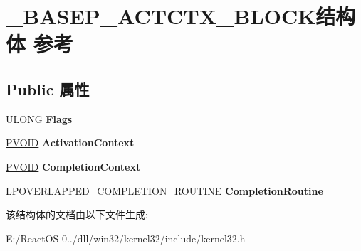 \hypertarget{struct___b_a_s_e_p___a_c_t_c_t_x___b_l_o_c_k}{}\section{\+\_\+\+B\+A\+S\+E\+P\+\_\+\+A\+C\+T\+C\+T\+X\+\_\+\+B\+L\+O\+C\+K结构体 参考}
\label{struct___b_a_s_e_p___a_c_t_c_t_x___b_l_o_c_k}
\subsection*{Public 属性}
\begin{DoxyCompactItemize}
\item 
\mbox{\label{struct___b_a_s_e_p___a_c_t_c_t_x___b_l_o_c_k_a3baee8956885171d416ee0adf0d7a9a3}} 
U\+L\+O\+NG {\bfseries Flags}
\item 
\mbox{\label{struct___b_a_s_e_p___a_c_t_c_t_x___b_l_o_c_k_a634e7fb89d1d0fbf27ab8cabf8c790a0}} 
\hyperlink{interfacevoid}{P\+V\+O\+ID} {\bfseries Activation\+Context}
\item 
\mbox{\label{struct___b_a_s_e_p___a_c_t_c_t_x___b_l_o_c_k_afbc931d9ee0fc86e67f716e90f7815cc}} 
\hyperlink{interfacevoid}{P\+V\+O\+ID} {\bfseries Completion\+Context}
\item 
\mbox{\label{struct___b_a_s_e_p___a_c_t_c_t_x___b_l_o_c_k_abc76986274265362f6f5983d11e986ba}} 
L\+P\+O\+V\+E\+R\+L\+A\+P\+P\+E\+D\+\_\+\+C\+O\+M\+P\+L\+E\+T\+I\+O\+N\+\_\+\+R\+O\+U\+T\+I\+NE {\bfseries Completion\+Routine}
\end{DoxyCompactItemize}


该结构体的文档由以下文件生成\+:\begin{DoxyCompactItemize}
\item 
E\+:/\+React\+O\+S-\/0../dll/win32/kernel32/include/kernel32.\+h\end{DoxyCompactItemize}
